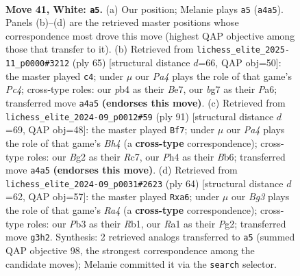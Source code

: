 \documentclass[11pt]{article}
\begin{document}
\clearpage

\begin{figure}[p]\centering
\begin{subfigure}{0.46\textwidth}\centering
\resizebox{\linewidth}{!}{%
\newchessgame
\chessboard[
  setfen={r1r5/1n3kbp/p2p2p1/4p1P1/PpP1P2P/1P3PBR/2K3B1/R7 w - - 3 41},
  showmover=false,
  pgfstyle=straightmove, color=movearrow, markmove={a4-a5}
]}
\caption{}
\end{subfigure}\hfill
\begin{subfigure}{0.46\textwidth}\centering
\resizebox{\linewidth}{!}{%
\newchessgame
\chessboard[
  setfen={8/r2rbkp1/p4p1p/1pp1p2P/P7/1PBP2P1/2P2PK1/R3R3 b - - 0 33},
  showmover=false,
  pgfstyle=straightmove, color=movearrow, markmove={c5-c4}
]}
\caption{}
\end{subfigure}
\\[4pt]
\begin{subfigure}{0.46\textwidth}\centering
\resizebox{\linewidth}{!}{%
\newchessgame
\chessboard[
  setfen={8/2r3pk/1bp1Bp2/p3pPpb/1r2P3/1P1P2KP/R1R1N1P1/8 b - - 9 46},
  showmover=false,
  pgfstyle=straightmove, color=movearrow, markmove={h5-f7}
]}
\caption{}
\end{subfigure}\hfill
\begin{subfigure}{0.46\textwidth}\centering
\resizebox{\linewidth}{!}{%
\newchessgame
\chessboard[
  setfen={1r6/pr6/p1p1k1p1/2Pp1p1p/RP1P4/P3PP2/3K2P1/1R6 w - - 0 33},
  showmover=false,
  pgfstyle=straightmove, color=movearrow, markmove={a4-a6}
]}
\caption{}
\end{subfigure}
\caption{\textbf{Move 41, White: \texttt{a5}.} (a) Our position; Melanie plays \texttt{a5} (\texttt{a4a5}). Panels (b)--(d) are the retrieved master positions whose correspondence most drove this move (highest QAP objective among those that transfer to it). (b) Retrieved from \texttt{lichess\_elite\_2025-11\_p0000\#3212} (ply 65) [structural distance $d$=66, QAP obj=50]: the master played \texttt{c4}; under $\mu$ our \emph{Pa4} plays the role of that game's \emph{Pc4}; cross-type roles: our \emph{p}b4 as their \emph{B}e7, our \emph{b}g7 as their \emph{P}a6; transferred move \texttt{a4a5} \textbf{(endorses this move)}. (c) Retrieved from \texttt{lichess\_elite\_2024-09\_p0012\#59} (ply 91) [structural distance $d$=69, QAP obj=48]: the master played \texttt{Bf7}; under $\mu$ our \emph{Pa4} plays the role of that game's \emph{Bh4} (a \textbf{cross-type} correspondence); cross-type roles: our \emph{B}g2 as their \emph{R}c7, our \emph{P}h4 as their \emph{B}b6; transferred move \texttt{a4a5} \textbf{(endorses this move)}. (d) Retrieved from \texttt{lichess\_elite\_2024-09\_p0031\#2623} (ply 64) [structural distance $d$=62, QAP obj=57]: the master played \texttt{Rxa6}; under $\mu$ our \emph{Bg3} plays the role of that game's \emph{Ra4} (a \textbf{cross-type} correspondence); cross-type roles: our \emph{P}b3 as their \emph{R}b1, our \emph{R}a1 as their \emph{P}g2; transferred move \texttt{g3h2}. Synthesis: 2 retrieved analogs transferred to \texttt{a5} (summed QAP objective 98, the strongest correspondence among the candidate moves); Melanie committed it via the \texttt{search} selector.}
\label{fig:thought-m80}
\end{figure}
\end{document}
